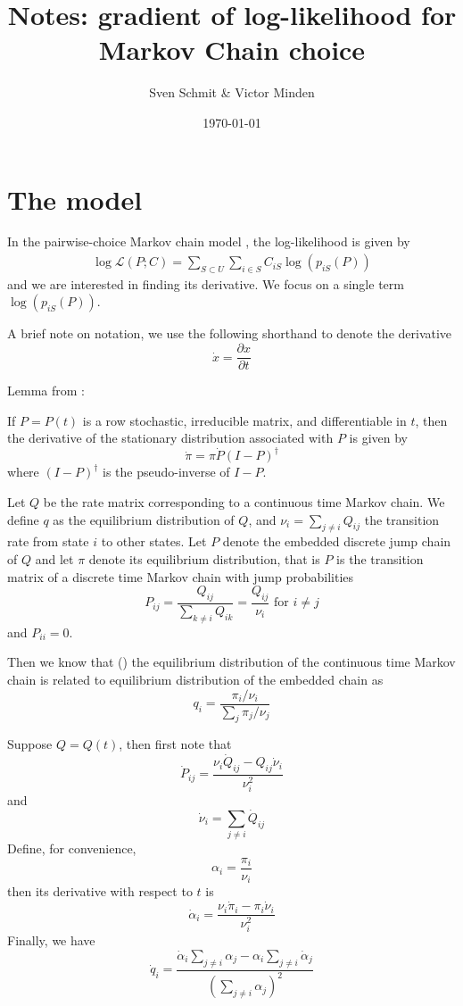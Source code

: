 \title{Notes: gradient of log-likelihood for Markov Chain choice}
\author{Sven Schmit \& Victor Minden}
\date{\today}



    \maketitle
    \section{The model}
    In the pairwise-choice Markov chain model \cite{pcmc}, the log-likelihood is given by
    \begin{align*}
        \log \mathcal{L}(P; C) = \sum_{S \subset U} \sum_{i \in S} C_{iS} \log(p_{iS}(P))
    \end{align*}
	and we are interested in finding its derivative.
	We focus on a single term $\log(p_{iS}(P))$.
	


	A brief note on notation, we use the following shorthand to denote the derivative
	\[
		\dot x = \frac{\partial x}{\partial t}
	\]

    Lemma from \cite[Theorem 3.2]{golub}:
    \begin{lemma}
        If $P = P(t)$ is a row stochastic, irreducible matrix, and differentiable in $t$, then
        the derivative of the stationary distribution associated with $P$ is given by
        \[
			\dot \pi = \pi \dot P (I - P)^\dagger
        \]
        where $(I - P)^\dagger$ is the pseudo-inverse of $I - P$.
    \end{lemma}

    Let $Q$ be the rate matrix corresponding to a continuous time Markov chain.
    We define $q$ as the equilibrium distribution of $Q$, 
	and $\nu_i = \sum_{j \ne i} Q_{ij}$ the transition rate from state $i$ to other states.
    Let $P$ denote the embedded discrete jump chain of $Q$ and let $\pi$ denote its equilibrium distribution,
    that is $P$ is the transition matrix of a discrete time Markov chain with jump probabilities
    \[
        P_{ij} = \frac{Q_{ij}}{\sum_{k\ne i} Q_{ik}} = \frac{Q_{ij}}{\nu_i} \text{ for } i \ne j
    \]
	and $P_{ii} = 0$.

    Then we know that (\cite[page 398]{ross}) the equilibrium distribution of the continuous time
	Markov chain is related to equilibrium distribution of the embedded chain as
    \[
        q_i = \frac{\pi_i / \nu_i}{\sum_j \pi_j / \nu_j}
    \]

	Suppose $Q = Q(t)$, then first note that
	\[
		\dot P_{ij} = \frac{\nu_i \dot Q_{ij} - Q_{ij} \dot \nu_i}{\nu_i^2}
	\]
	and
	\[
		\dot \nu_i = \sum_{j \ne i} \dot Q_{ij}
	\]
	Define, for convenience,
	\[
		\alpha_i = \frac{\pi_i}{\nu_i}
	\]
	then its derivative with respect to $t$ is
	\[
		\dot \alpha_i = \frac{\nu_i \dot \pi_i - \pi_i \dot \nu_i}{\nu_i^2}
	\]
	Finally, we have
	\[
		\dot q_i = 
		\frac { \dot \alpha_i \sum_{j \ne i} \alpha_j - \alpha_i \sum_{j \ne i} \dot \alpha_j }
				{ \left( \sum_{j \ne i} \alpha_j \right)^2 }
	\]

    
    


